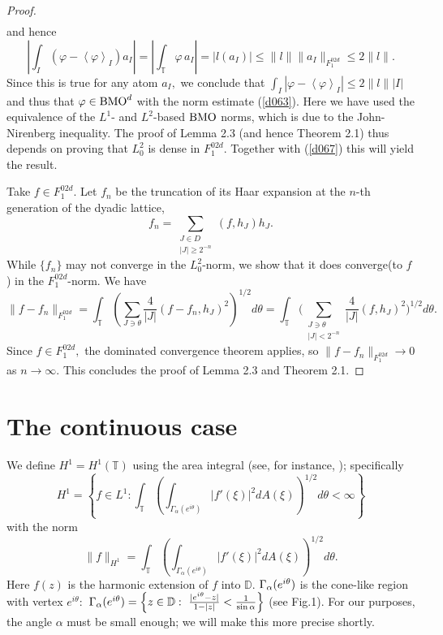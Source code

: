 \documentclass[psamsfonts]{conm-p-l}
\theoremstyle{definition}
\theoremstyle{remark}
\numberwithin{equation}{section}
\begin{document}
\begin{proof}
\begin{align*}
\end{align*}
and hence
$$
\left|\int_I\left(\varphi-\left<\varphi\right>_I\right)a_I\right|=\left|\int_{\mathbb{T}}\varphi\,a_I\right|=
|l(a_I)|\le\|l\|\|a_I\|_{F^{02d}_1}\le2\|l\|.
$$
Since this is true for any atom $a_I,$ we conclude that $\int_I|\varphi-\left<\varphi\right>_I|\le2\|l\||I|$ and thus 
that $\varphi\in {{\rm{BMO}}}^d$ with the norm estimate (\ref{d063}). Here we have used the equivalence of the $L^1\!$- and $L^2\!$-based ${{\rm{BMO}}}$ norms, which is due to the John-Nirenberg inequality. The proof of Lemma 2.3 (and hence Theorem 2.1) thus depends on proving that $L^2_0$ is dense in ${F^{02d}_1}.$ Together with (\ref{d067}) this will yield the result. 
\par

Take $f\in {F^{02d}_1}.$ Let $f_n$ be the truncation of its Haar expansion at the $n\!$-th generation of the dyadic lattice, 
$$
f_n=\sum_{\substack{J\in D\\|J|\ge2^{{-n}}}}(f,h_J)h_J.
$$ 
While $\{f_n\}$ may not converge in the $L^2_0\!$-norm, we show that it does converge\linebreak (to $f$) in the ${F^{02d}_1}\!$-norm. We have
$$
\|f-f_n\|_{F^{02d}_1}=\int_{\mathbb{T}}\left(\sum_{J\ni\theta}\frac4{|J|}(f-f_n,h_J)^2\right)^{1/2}d\theta=
\int_{\mathbb{T}}\Biggl(\sum_{\substack{J\ni\theta\\|J|<2^{{-n}}}}\frac4{|J|}(f,h_J)^2\Biggr)^{1/2}d\theta.
$$
Since $f\in{F^{02d}_1},$ the dominated convergence theorem applies, so $\|f-f_n\|_{F^{02d}_1}\to0$ as $n\to\infty.$ This concludes the proof of Lemma 2.3 and Theorem 2.1.
\end{proof}
\section{The continuous case}
We define $H^1=H^1(\mathbb{T})$ using the area integral (see, for instance, \cite{stein}); specifically
{\begin{equation}\label{d2}{
H^1=\left\{f\in L^1: 
\int_\mathbb{T}\left(\int_{\Gamma_\alpha(e^{i\theta})}|f'(\xi)|^2dA(\xi)\right)^{1/2}d\theta<\infty\right\}
}\end{equation}}
with the norm 
$$
\| f\|_{H^1}=\int_\mathbb{T}\left(\int_{\Gamma_\alpha(e^{i\theta})}|f'(\xi)|^2dA(\xi)\right)^{1/2}d\theta. 
$$
Here 
$f(z)$ is the harmonic extension of $f$ into $\mathbb{D}.$ ${\displaystyle} \Gamma_\alpha(e^{i\theta})$ is the cone-like region with vertex $e^{i\theta}:$
${\displaystyle} \Gamma_\alpha(e^{i\theta})=\left\{z\in \mathbb{D}:~\frac{|e^{i\theta}-z|}{1-|z|}< \frac1{\sin\alpha}\right\}$ (see Fig.1). For our purposes, the angle $\alpha$ must be small enough; we will make this more precise shortly.
\end{document}
